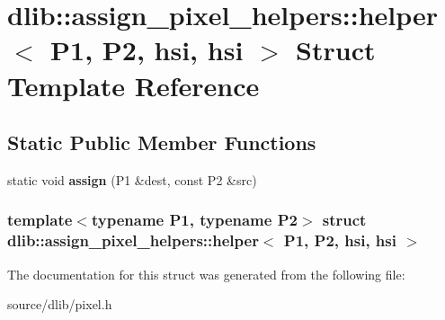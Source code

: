 \hypertarget{structdlib_1_1assign__pixel__helpers_1_1helper_3_01P1_00_01P2_00_01hsi_00_01hsi_01_4}{
\section{dlib::assign\_\-pixel\_\-helpers::helper$<$ P1, P2, hsi, hsi $>$ Struct Template Reference}
\label{structdlib_1_1assign__pixel__helpers_1_1helper_3_01P1_00_01P2_00_01hsi_00_01hsi_01_4}
}
\subsection*{Static Public Member Functions}
\begin{DoxyCompactItemize}
\item 
\hypertarget{structdlib_1_1assign__pixel__helpers_1_1helper_3_01P1_00_01P2_00_01hsi_00_01hsi_01_4_ace19b7489b0e1c16787567b1d80d73b1}{
static void {\bfseries assign} (P1 \&dest, const P2 \&src)}
\label{structdlib_1_1assign__pixel__helpers_1_1helper_3_01P1_00_01P2_00_01hsi_00_01hsi_01_4_ace19b7489b0e1c16787567b1d80d73b1}

\end{DoxyCompactItemize}
\subsubsection*{template$<$typename P1, typename P2$>$ struct dlib::assign\_\-pixel\_\-helpers::helper$<$ P1, P2, hsi, hsi $>$}



The documentation for this struct was generated from the following file:\begin{DoxyCompactItemize}
\item 
source/dlib/pixel.h\end{DoxyCompactItemize}
